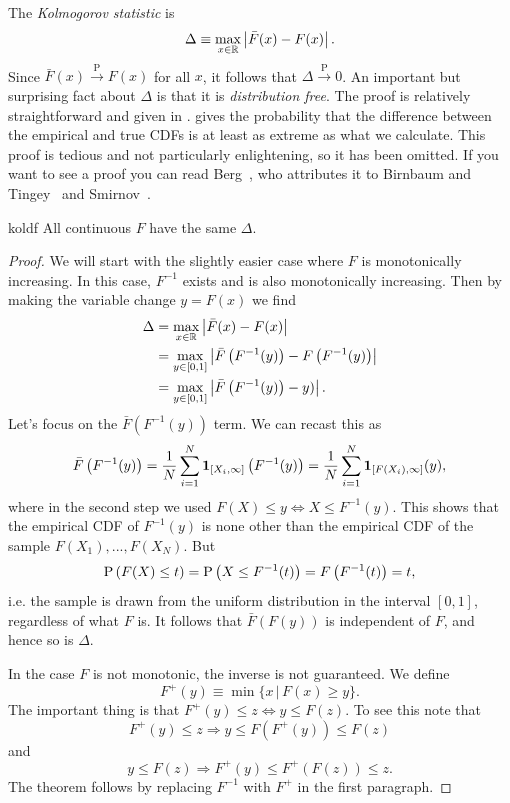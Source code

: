 The {\it Kolmogorov statistic} is
\begin{equation}
  \Delta\equiv\max_{x\in\mathbb{R}}\left|\bar{F}(x)-F(x)\right|.
\end{equation}
Since $\bar{F}(x)\xrightarrow{\text{P}}F(x)$ for all $x$, it follows
that $\Delta\xrightarrow{\text{P}}0$. An important but surprising
fact about $\Delta$ is that it is {\it distribution free}.
The proof is relatively straightforward and given in
.  gives
the probability that the difference between the empirical and true
CDFs is at least as extreme as what we calculate. This proof is
tedious and not particularly enlightening, so it has been omitted.
If you want to see a proof you can read Berg~\cite{berg_markov_2004},
who attributes it to Birnbaum and Tingey~\cite{birnbaum_one-sided_1951}
and Smirnov~\cite{smirnoff_sur_1939}.
\begin{theorem}{}{koldf}
  All continuous $F$ have the same $\Delta$. 
  \begin{proof}
    We will start with the slightly easier case where $F$ is monotonically
    increasing. In this case, $F^{-1}$ exists and is also monotonically
    increasing. Then by making the variable change $y=F(x)$ we find
    \begin{equation*}
      \begin{aligned}
      \Delta&=\max_{x\in\mathbb{R}}\left|\bar{F}(x)-F(x)\right|\\
            &=\max_{y\in[0,1]}\left|
                \bar{F}\left(F^{-1}(y)\right)-F\left(F^{-1}(y)\right)\right|\\
            &=\max_{y\in[0,1]}\left|
                \bar{F}\left(F^{-1}(y)\right)-y)\right|.
      \end{aligned}
    \end{equation*}
    Let's focus on the $\bar{F}(F^{-1}(y))$ term. We can recast this as
    $$
      \bar{F}\left(F^{-1}(y)\right)
          =\frac{1}{N}\sum_{i=1}^N{\mathbf 1}_{[X_i,\infty]}\left(F^{-1}(y)\right)
          =\frac{1}{N}\sum_{i=1}^N{\mathbf 1}_{[F(X_i),\infty]}(y),
    $$
    where in the second step we used 
    $F(X)\leq y\Leftrightarrow X\leq F^{-1}(y)$. This shows that the
    empirical CDF of $F^{-1}(y)$ is none other than the empirical CDF 
    of the sample $F(X_1),...,F(X_N)$. But
    $$
      \operatorname{P}\left(F(X)\leq t\right)=\operatorname{P}\left(X\leq F^{-1}(t)\right)=F\left(F^{-1}(t)\right)=t,
    $$
    i.e. the sample is drawn from the uniform distribution in the
    interval $[0,1]$, regardless of what $F$ is. It follows that 
    $\bar{F}\left(F(y)\right)$ is independent of $F$, and hence so 
    is $\Delta$.

    In the case $F$ is not monotonic, the inverse is not guaranteed.
    We define
    $$
      F^+(y)\equiv\min\{x\,|\,F(x)\geq y\}.
    $$
    The important thing is that $F^+(y)\leq z\Leftrightarrow y\leq F(z)$.
    To see this note that
    $$
      F^+(y)\leq z \Rightarrow y\leq F\left(F^+(y)\right)\leq F(z)
    $$
    and
    $$
      y\leq F(z)\Rightarrow F^+(y)\leq F^+\left(F(z)\right)\leq z.
    $$
    The theorem follows by replacing $F^{-1}$ with $F^+$ 
    in the first paragraph.
  \end{proof}
\end{theorem}
